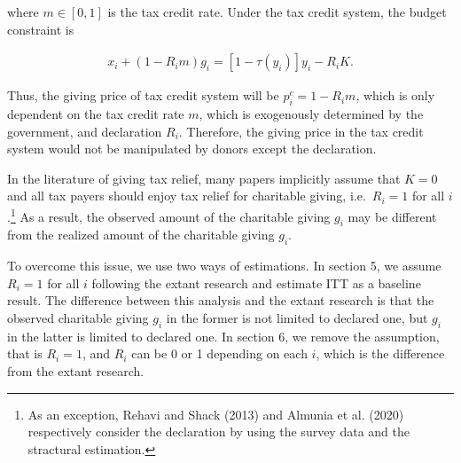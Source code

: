 \documentclass[
  11pt,
  a4paper,
]{article}
\begin{document}
where \(m \in [0, 1]\) is the tax credit rate. Under the tax credit system, the budget constraint is

\begin{align}
    x_i + (1 - R_im) g_i = [1 - \tau(y_i)] y_i − R_iK.
\end{align}

Thus, the giving price of tax credit system will be \(p_i^c = 1 - R_im\), which is only dependent on the tax credit rate \(m\), which is exogenously determined by the government, and declaration \(R_i\).
Therefore, the giving price in the tax credit system would not be manipulated by donors except the declaration.

In the literature of giving tax relief, many papers implicitly assume that \(K=0\) and all tax payers should enjoy tax relief for charitable giving, i.e.~\(R_i=1\) for all \(i\).\footnote{As an exception, Rehavi and Shack (2013) and Almunia et al. (2020) respectively consider the declaration by using the survey data and the stractural estimation.} As a result, the observed amount of the charitable giving \(g_i\) may be different from the realized amount of the charitable giving \(g_i\).

To overcome this issue, we use two ways of estimations. In section 5, we assume \(R_i=1\) for all \(i\) following the extant research and estimate ITT as a baseline result. The difference between this analysis and the extant research is that the observed charitable giving \(g_i\) in the former is not limited to declared one, but \(g_i\) in the latter is limited to declared one. In section 6, we remove the assumption, that is \(R_i=1\), and \(R_i\) can be 0 or 1 depending on each \(i\), which is the difference from the extant research.
\end{document}
